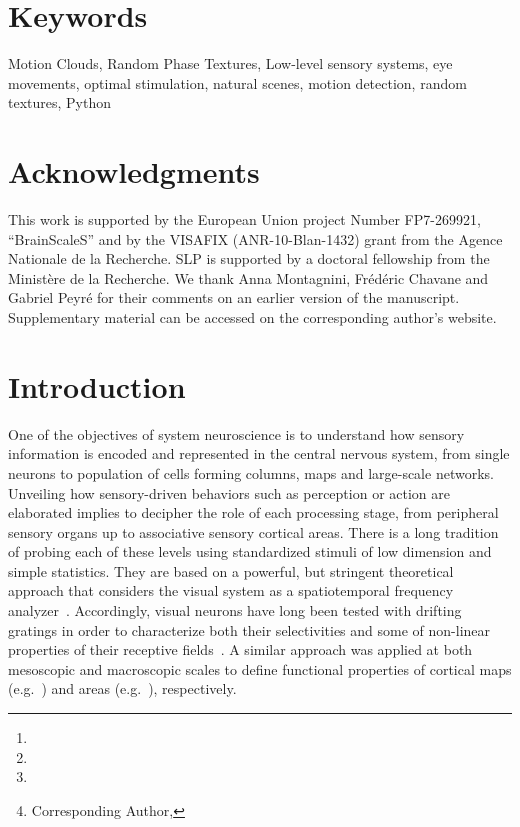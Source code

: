 \documentclass[a4paper,11pt]{article}%
\title{\Title}%
\author[1,2]{\AuthorA \thanks{\EmailA}}
\author[1,2]{\AuthorB \thanks{\EmailB}}
\author[1,2]{\AuthorC \thanks{\EmailC}}
\author[1,2]{\AuthorD \thanks{Corresponding Author, \EmailD}}%
\affil[1]{\AddressA}
\affil[2]{\AddressB}
\date{}%
\newcommand{\Abstract}{%
Choosing an appropriate set of stimuli is essential in order to characterize the response of a sensory system to a particular functional dimension, such as the eye movement following the motion of a visual scene. %
Here, we describe a framework to generate random texture movies with controlled information content, i.e., Motion Clouds. These stimuli are defined using a generative model which is based on controlled experimental parametrization. %
We show that Motion Clouds correspond to dense mixing of localized moving gratings with random positions. Their global envelope is similar to natural-like stimulation with an approximate full-field translation corresponding to a retinal slip. %
We describe the construction of these stimuli mathematically and propose an open-source python-based implementation. %
Examples of the use of this framework are shown. We also propose extensions to other modalities such as color vision, touch and audition.%
}%
\newcommand{\Keywords}%
{Motion Clouds, Random Phase Textures, Low-level sensory systems, eye movements, optimal stimulation, natural scenes, motion detection, random textures, Python}
\newcommand{\Acknowledgments}{%
This work is supported by the European Union project Number FP7-269921, ``BrainScaleS'' and by the VISAFIX (ANR-10-Blan-1432)  grant from the Agence Nationale de la Recherche. SLP is supported by a doctoral fellowship from the Minist{\`e}re de la Recherche. We thank Anna Montagnini, Fr\'ed\'eric Chavane and Gabriel Peyr\'e for their comments on an earlier version of the manuscript. Supplementary material can be accessed on the corresponding author's website.}%
\begin{document}
\maketitle




\begin{abstract}
\Abstract
\end{abstract}%
\section*{Keywords}
\Keywords
\section*{Acknowledgments}
\Acknowledgments

\section{Introduction }\label{intro}

One of the objectives of system neuroscience is to understand how sensory information is encoded and represented in the central nervous system, from single neurons to population of cells forming columns, maps and large-scale networks. Unveiling how sensory-driven behaviors such as perception or action are elaborated implies to decipher the role of each processing stage, from peripheral sensory organs up to associative sensory cortical areas. There is a long tradition of probing each of these levels using standardized stimuli of low dimension and simple statistics. They are based on a powerful, but stringent theoretical approach that considers the visual system as a spatiotemporal frequency analyzer~\citep{Graham79,Watson83}. Accordingly, visual neurons have long been tested with drifting gratings in order to characterize both their selectivities and some of non-linear properties of their receptive fields~\citep{DeValois1988Spatial}. A similar approach was applied at both mesoscopic and macroscopic scales to define functional properties of cortical maps (e.g.~\citep{Blasdel86,TsO90}) and areas (e.g.~\citep{Singh2000Spatiotemporal,Henriksson08}), respectively.  
\end{document}
